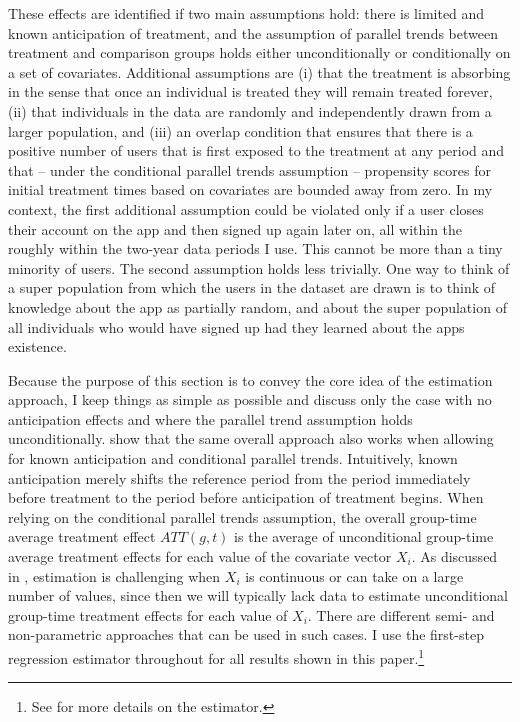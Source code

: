 These effects are identified if two main assumptions hold: there is limited and
known anticipation of treatment, and the assumption of parallel trends between
treatment and comparison groups holds either unconditionally or conditionally
on a set of covariates. Additional assumptions are (i) that the treatment is
absorbing in the sense that once an individual is treated they will remain
treated forever, (ii) that individuals in the data are randomly and
independently drawn from a larger population, and (iii) an overlap condition
that ensures that there is a positive number of users that is first exposed to
the treatment at any period and that -- under the conditional parallel trends
assumption -- propensity scores for initial treatment times based on covariates
are bounded away from zero. In my context, the first additional assumption
could be violated only if a user closes their account on the app and then
signed up again later on, all within the roughly within the two-year data
periods I use. This cannot be more than a tiny minority of users. The second
assumption holds less trivially. One way to think of a super population from
which the users in the dataset are drawn is to think of knowledge about the app
as partially random, and about the super population of all individuals who
would have signed up had they learned about the apps existence.

Because the purpose of this section is to convey the core idea of the
estimation approach, I keep things as simple as possible and discuss only the
case with no anticipation effects and where the parallel trend assumption holds
unconditionally. \citet{callaway2021difference} show that the same overall
approach also works when allowing for known anticipation and conditional
parallel trends. Intuitively, known anticipation merely shifts the reference
period from the period immediately before treatment to the period before
anticipation of treatment begins. When relying on the conditional parallel
trends assumption, the overall group-time average treatment effect $ATT(g, t)$
is the average of unconditional group-time average treatment effects for each
value of the covariate vector $X_i$. As discussed in \citet{roth2022trending},
estimation is challenging when $X_i$ is continuous or can take on a large
number of values, since then we will typically lack data to estimate
unconditional group-time treatment effects for each value of $X_i$. There are
different semi- and non-parametric approaches that can be used in such cases. I
use the first-step regression estimator throughout for all results shown in
this paper.\footnote{See \citet{callaway2021difference, roth2022trending} for more
details on the estimator.}

